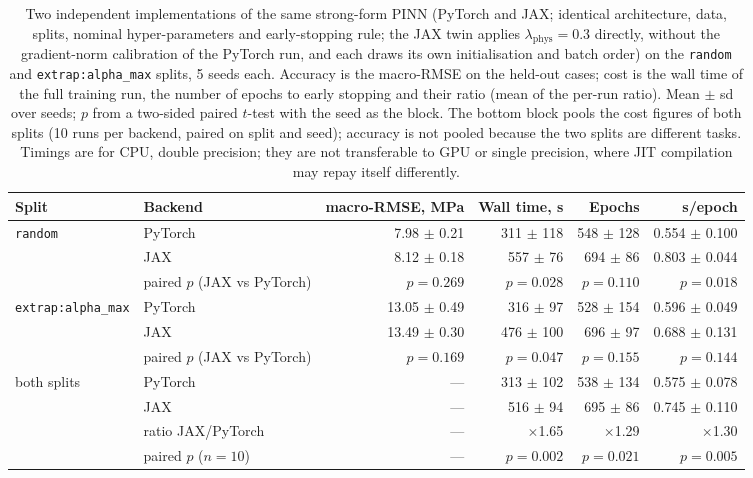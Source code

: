 \begin{table}[htbp]
\centering
\caption{Two independent implementations of the same strong-form PINN (PyTorch and JAX; identical architecture, data, splits, nominal hyper-parameters and early-stopping rule; the JAX twin applies $\lambda_{\mathrm{phys}}=0.3$ directly, without the gradient-norm calibration of the PyTorch run, and each draws its own initialisation and batch order) on the \texttt{random} and \texttt{extrap:alpha\_max} splits, 5 seeds each. Accuracy is the macro-RMSE on the held-out cases; cost is the wall time of the full training run, the number of epochs to early stopping and their ratio (mean of the per-run ratio). Mean $\pm$ sd over seeds; $p$ from a two-sided paired $t$-test with the seed as the block. The bottom block pools the cost figures of both splits (10 runs per backend, paired on split and seed); accuracy is not pooled because the two splits are different tasks. Timings are for CPU, double precision; they are not transferable to GPU or single precision, where JIT compilation may repay itself differently.}
\label{tab:backend}
\small
\begin{tabular}{@{}llrrrr@{}}
\toprule
Split & Backend & macro-RMSE, MPa & Wall time, s & Epochs & s/epoch \\
\midrule
\texttt{random} & PyTorch & 7.98 $\pm$ 0.21 & 311 $\pm$ 118 & 548 $\pm$ 128 & 0.554 $\pm$ 0.100 \\
 & JAX & 8.12 $\pm$ 0.18 & 557 $\pm$ 76 & 694 $\pm$ 86 & 0.803 $\pm$ 0.044 \\
 & paired $p$ (JAX vs PyTorch) & $p = 0.269$ & $p = 0.028$ & $p = 0.110$ & $p = 0.018$ \\
\addlinespace
\texttt{extrap:alpha\_max} & PyTorch & 13.05 $\pm$ 0.49 & 316 $\pm$ 97 & 528 $\pm$ 154 & 0.596 $\pm$ 0.049 \\
 & JAX & 13.49 $\pm$ 0.30 & 476 $\pm$ 100 & 696 $\pm$ 97 & 0.688 $\pm$ 0.131 \\
 & paired $p$ (JAX vs PyTorch) & $p = 0.169$ & $p = 0.047$ & $p = 0.155$ & $p = 0.144$ \\
\midrule
both splits & PyTorch & --- & 313 $\pm$ 102 & 538 $\pm$ 134 & 0.575 $\pm$ 0.078 \\
 & JAX & --- & 516 $\pm$ 94 & 695 $\pm$ 86 & 0.745 $\pm$ 0.110 \\
 & ratio JAX/PyTorch & --- & $\times$1.65 & $\times$1.29 & $\times$1.30 \\
 & paired $p$ ($n = 10$) & --- & $p = 0.002$ & $p = 0.021$ & $p = 0.005$ \\
\bottomrule
\end{tabular}
\end{table}
